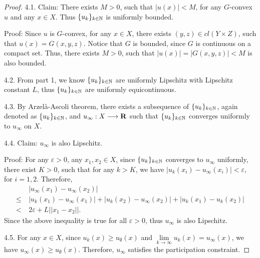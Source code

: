 \begin{proof}
	4.1. Claim: There exists $M>0$, such that $|u(x)|<M$, for any $G$-convex $u$ and any $x \in X$. Thus $\{u_k\}_{k \in \mathbb{N}}$ is uniformly bounded.
											
		Proof: Since $u$ is $G$-convex, for any $x\in X$, there exists $(y, z)\in cl( Y \times Z) $, such that $u(x) = G(x,y,z)$. Notice that $G$ is bounded, since $G$ is continuous on a compact set. Thus, there exists $M>0$, such that $|u(x)| =| G(x,y,z)|<M$ is also bounded.\medskip
											
	4.2. From part 1, we know $\{u_k\}_{k\in \mathbb{N}}$ are uniformly Lipschitz with Lipschitz constant $L$, thus $\{u_k\}_{k\in \mathbb{N}}$ are uniformly equicontinuous.\medskip
											
	4.3. By Arzel\`a-Ascoli theorem, there exists a subsequence of $\{u_k\}_{k\in \mathbb{N}}$, again denoted as $\{u_k\}_{k\in \mathbb{N}}$, and $u_{\infty} : X \longrightarrow {\mathbf R}$ such that $\{u_k\}_{k\in \mathbb{N}}$  converges uniformly to $u_{\infty}$ on $X$.\medskip
											
	4.4. Claim: $u_{\infty}$ is also Lipschitz.
											
		Proof: For any $\varepsilon >0$, any $x_1, x_2 \in X$, since $\{u_k\}_{k\in \mathbb{N}}$ converges to $u_{\infty}$ uniformly, there exist $K>0$, such that for any $k >K$, we have $|u_k(x_i) -u_{\infty}(x_i)|<\varepsilon$, for $i=1,2$. Therefore, 
			\begin{equation*}
			\begin{split}
			&~|u_{\infty}(x_1) -u_{\infty}(x_2)| \\
			\le & ~|u_k(x_1)-u_{\infty}(x_1)| + |u_k(x_2)-u_{\infty}(x_2)| + |u_k(x_1) -u_k(x_2)| \\
			< & ~2\varepsilon + L ||x_1-x_2||.
			\end{split}
			\end{equation*}
		Since the above inequality is true for all $\varepsilon >0$, thus $u_{\infty}$ is also Lipschitz.\medskip
											
	4.5. For any $x\in X$, since $u_k(x)\ge u_{\emptyset}(x)$ and $\lim\limits_{k\rightarrow \infty} u_{k}(x) = u_{\infty}(x)$, we have $u_{\infty}(x)\ge u_{\emptyset}(x)$. Therefore, $u_{\infty}$ satisfies the participation constraint.\medskip
											

\end{proof}
